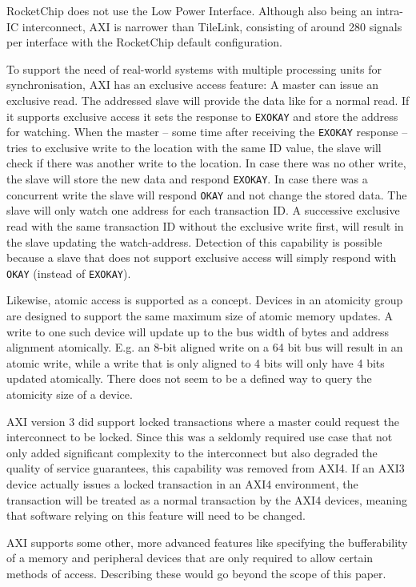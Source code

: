 \documentclass[journal,a4paper]{IEEEtran}
\begin{document}
RocketChip does not use the Low Power Interface.
Although also being an intra-IC interconnect, AXI is narrower than TileLink, consisting of around 280 signals per interface with the RocketChip default configuration.

To support the need of real-world systems with multiple processing units for synchronisation, AXI has an exclusive access feature: A master can issue an exclusive read.
The addressed slave will provide the data like for a normal read.
If it supports exclusive access it sets the response to \texttt{EXOKAY} and store the address for watching.
When the master -- some time after receiving the \texttt{EXOKAY} response -- tries to exclusive write to the location with the same ID value, the slave will check if there was another write to the location.
In case there was no other write, the slave will store the new data and respond \texttt{EXOKAY}. In case there was a concurrent write the slave will respond \texttt{OKAY} and not change the stored data. The slave will only watch one address for each transaction ID. A successive exclusive read with the same transaction ID without the exclusive write first, will result in the slave updating the watch-address.
Detection of this capability is possible because a slave that does not support exclusive access will simply respond with \texttt{OKAY} (instead of \texttt{EXOKAY}).

Likewise, atomic access is supported as a concept.
Devices in an atomicity group are designed to support the same maximum size of atomic memory updates.
A write to one such device will update up to the bus width of bytes and address alignment atomically.
E.g. an 8-bit aligned write on a 64 bit bus will result in an atomic write, while a write that is only aligned to 4 bits will only have 4 bits updated atomically. There does not seem to be a defined way to query the atomicity size of a device.

AXI version 3 did support locked transactions where a master could request the interconnect to be locked. Since this was a seldomly required use case that not only added significant complexity to the interconnect but also degraded the quality of service guarantees, this capability was removed from AXI4. If an AXI3 device actually issues a locked transaction in an AXI4 environment, the transaction will be treated as a normal transaction by the AXI4 devices, meaning that software relying on this feature will need to be changed.

AXI supports some other, more advanced features like specifying the bufferability of a memory and peripheral devices that are only required to allow certain methods of access. Describing these would go beyond the scope of this paper.
\end{document}
